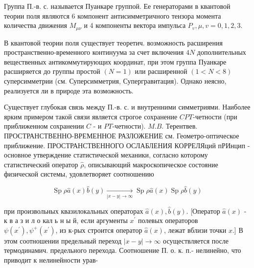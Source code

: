 \documentclass[10pt]{article}
\begin{document}
Группа П.-в. с. называется Пуанкаре группой. Ее генераторами в квантовой теории поля являются 6 компонент антисимметричного тензора момента количества движения $M_{\mu \nu}$ и 4 компоненты вектора импульса $P_{v}, \mu, v=0,1,2,3$.



В квантовой теории поля существует теоретич. возможность расширения пространственно-временного континуума за счет включения $4 N$ дополнительных вещественных антикоммутирующих координат, при этом группа Пуанкаре расширяется до группы простой $(N=1)$ или расширенной $(1<N<8)$ суперсимметрии (см. Суперсимметрия, Супергравитация). Однако неясно, реализуется ли в природе эта возможность.



Существует глубокая связь между П.-в. с. и внутренними симметриями. Наиболее ярким примером такой связи является строгое сохранение $C P T$-четности (при приближенном сохранении $C$ - и $P T$-четности). $M . B$. Терентвев. ПРОСТРАНСТВЕННО-ВРЕМЕННОЕ РАЗЛОЖЕНИЕ см. Геометро-оптическое приближение. ПРОСТРАНСТВЕННОГО ОСЛАБЛЕНИЯ КОРРЕЛЯций пРИнцип - основное утверждение статистической механики, согласно которому статистический оператор $\hat{\rho}$, описывающий макроскопическое состояние физической системы, удовлетворяет соотношению



\[

\operatorname{Sp} \rho \hat{a}(x) \hat{b}(y) \underset{|x-y| \rightarrow \infty}{\longrightarrow} \operatorname{Sp} \rho \hat{a}(x) \operatorname{Sp} \rho \hat{b}(y)

\]



при произвольных квазилокальных операторах $\hat{a}(x), \hat{b}(y)$. [Оператор $\hat{a}(x)$ - к в а з и л о кал ь н ы й, если аргументы $x^{\prime}$ полевых операторов $\psi\left(x^{\prime}\right), \psi^{+}\left(x^{\prime}\right)$, из к-рых строится оператор $\hat{a}(x)$, лежат вблизи точки $x$.] В этом соотношении предельный переход $|x-y| \rightarrow \infty$ осуществляется после термодинамич. предельного перехода. Соотношение П. о. к. п.- нелинейно, что приводит к нелинейности урав-
\end{document}
